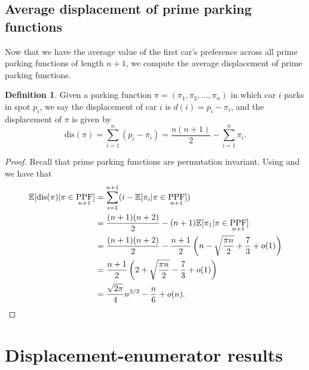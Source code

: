 \documentclass[12pt,reqno]{amsart}
\theoremstyle{definition}
\newtheorem{definition}{Definition}
\newcommand{\E}{\mathbb{E}}
\theoremstyle{remark}
\DeclareMathOperator{\PPF}{PPF}
\begin{document}
\subsection{Average displacement of prime parking functions} Now that we have the average value of the first car's preference across all prime parking functions of length $n+1$, we compute the average displacement of prime parking functions. 



\begin{definition}\label{def:displacement}
    Given a parking function $\pi=(\pi_1,\pi_2,\ldots,\pi_n)$ in which car $i$ parks in spot $p_i$, 
we say the displacement of car $i$ is $d(i)=p_i-\pi_i$, and the displacement of $\pi$ is given by 
$$\text{dis} (\pi)=\sum_{i=1}^n \left(p_i-\pi_i\right)=\frac{n(n+1)}{2}
-\sum_{i=1}^n\pi_i.$$ 
\end{definition}



\expecteddisplacementforPPFs*

\begin{proof}
Recall that prime parking functions are permutation invariant. Using  and  we have that
    \begin{align*}
    \E [\text{dis} (\pi) | \pi \in \PPF_{n+1}]&=\sum_{i=1}^{n+1}(i-\E[\pi_i| \pi \in \PPF_{n+1}])\\
    &=\frac{(n+1)(n+2)}{2}-(n+1)\E[\pi_1| \pi \in \PPF_{n+1}] \nonumber\\
    &=\frac{(n+1)(n+2)}{2}-\frac{n+1}{2}\left(n-\sqrt{\frac{\pi n}{2}}+\frac73+o(1)
    \right)\nonumber\\
    &=\frac{n+1}{2}\left(2+\sqrt{\frac{\pi n}{2}}-\frac73+
    o(1)\right)\nonumber\\
    &=\frac{\sqrt{2\pi}}{4}n^{3/2}-\frac{n}{6}+o(n). \nonumber\qedhere
    \end{align*}
\end{proof}



\section{Displacement-enumerator results}\label{sec: Displacement Enum}
\end{document}
